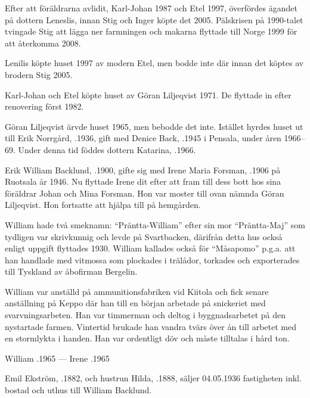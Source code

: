 Efter att föräldrarna avlidit, Karl-Johan 1987 och Etel 1997, överfördes ägandet på dottern Leneslis, innan Stig och Inger köpte det 2005. Pälskrisen på 1990-talet tvingade Stig att lägga ner farmningen och makarna flyttade till Norge 1999 för att återkomma 2008.


Lenilis köpte huset 1997 av modern Etel, men bodde inte där innan det köptes av brodern Stig 2005.\jhvspace{}


Karl-Johan och Etel köpte huset av Göran Liljeqvist 1971. De flyttade in efter renovering först 1982.\jhvspace{}


Göran Liljeqvist ärvde huset 1965, men bebodde det inte. Istället hyrdes huset ut till Erik Norrgård, .1936, gift med Denice Back, .1945 i Pensala, under åren 1966--69. Under denna tid föddes dottern Katarina, .1966.


Erik William Backlund, .1900, gifte sig med Irene Maria Forsman, .1906 på Ruotsala år 1946. Nu flyttade Irene dit efter att fram till dess bott hos sina föräldrar Johan och Mina Forsman. Hon var moster till ovan nämnda Göran Liljeqvist. Hon fortsatte att hjälpa till på hemgården.

William hade två smeknamn: ``Präntta-William'' efter sin mor ``Präntta-Maj'' som tydligen var skrivkunnig och levde på Svartbacken, därifrån detta hus också enligt uppgift flyttades 1930. William kallades också för ``Måsapomo'' p.g.a. att han handlade med vitmossa som plockades i trälådor, torkades och exporterades till Tyskland av åbofirman Bergelin.

William var anställd på ammunitionsfabriken vid Kiitola och fick senare anställning på Keppo där han till en början arbetade på snickeriet med svarvningsarbeten. Han var timmerman och deltog i byggnadsarbetet på den nystartade farmen. Vintertid brukade han vandra tvärs över ån till arbetet med en stormlykta i handen. Han var ordentligt döv och måste tilltalas i hård ton.

William .1965  ---  Irene .1965


Emil Ekström, .1882, och hustrun Hilda, .1888, säljer 04.05.1936 fastigheten inkl. bostad och uthus till William Backlund.



